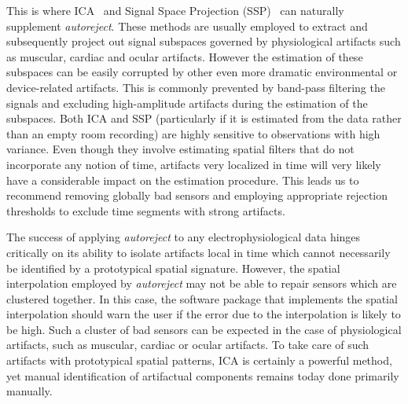 This is where \ac{ICA}~\citep{vigario1997extraction} and Signal Space Projection (SSP)~\citep{uusitalo1997signal} can naturally supplement \emph{autoreject}. These methods are usually employed to extract and subsequently project out signal subspaces governed by physiological artifacts such as muscular, cardiac and ocular artifacts. However the estimation of these subspaces can be easily corrupted by other even more dramatic environmental or device-related artifacts. This is commonly prevented by band-pass filtering the signals and excluding high-amplitude artifacts during the estimation of the subspaces. Both ICA and SSP (particularly if it is estimated from the data rather than an empty room recording) are highly sensitive to observations with high variance. Even though they involve estimating spatial filters that do not incorporate any notion of time, artifacts very localized in time will very likely have a considerable impact on the estimation procedure. This leads us to recommend removing globally bad sensors and employing appropriate rejection thresholds to exclude time segments with strong artifacts. 

The success of applying \emph{autoreject} to any electrophysiological data hinges critically on its ability to isolate artifacts local in time which cannot necessarily be identified by a prototypical spatial signature. However, the spatial interpolation employed by \emph{autoreject} may not be able to repair sensors which are clustered together. In this case, the software package that implements the spatial interpolation should warn the user if the error due to the interpolation is likely to be high. Such a cluster of bad sensors can be expected in the case of physiological artifacts, such as muscular, cardiac or ocular artifacts. To take care of such artifacts with prototypical spatial patterns, ICA is certainly a powerful method, yet manual identification of artifactual components remains today done primarily manually.

